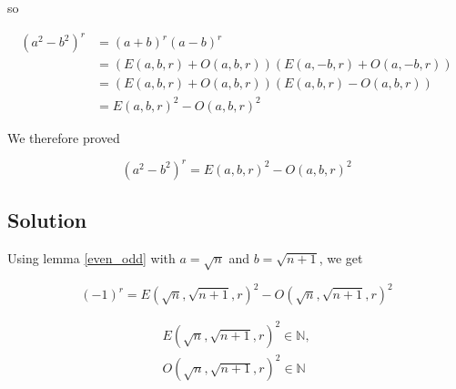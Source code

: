 \noindent so

\begin{align*}
(a^2 - b^2)^r &= (a + b)^r (a - b)^r \\
&= (E(a, b, r) + O(a, b, r)) (E(a, -b, r) + O(a, -b, r)) \\
&= (E(a, b, r) + O(a, b, r)) (E(a, b, r) - O(a, b, r)) \\
&= E(a, b, r)^2 - O(a, b, r)^2
\end{align*}

\noindent We therefore proved 

\begin{lem}\label{even_odd}
\begin{equation*}
(a^2 - b^2)^r = E(a, b, r)^2 - O(a, b, r)^2
\end{equation*}  
\end{lem}

\subsection{Solution}

Using lemma \ref{even_odd} with $a = \sqrt{n}$ and $b = \sqrt{n + 1}$, we get

\begin{equation}
(-1)^r = E(\sqrt{n}, \sqrt{n + 1}, r)^2 - O(\sqrt{n}, \sqrt{n + 1}, r)^2\tag{L}
\end{equation} 

\begin{lem}\label{squared}
\begin{gather*}
E(\sqrt{n}, \sqrt{n + 1}, r)^2 \in \mathbb{N}, \\
O(\sqrt{n}, \sqrt{n + 1}, r)^2 \in \mathbb{N}
\end{gather*}
\end{lem}
 
